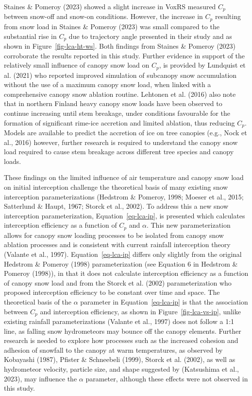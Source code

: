 \documentclass[
  letterpaper,
  DIV=11,
  numbers=noendperiod]{scrartcl}
\begin{document}
Staines \& Pomeroy (2023) showed a slight increase in VoxRS measured
\(C_p\) between snow-off and snow-on conditions. However, the increase
in \(C_p\) resulting from snow load in Staines \& Pomeroy (2023) was
small compared to the substantial rise in \(C_p\) due to trajectory
angle presented in their study and as shown in
Figure~\ref{fig-lca-ht-ws}. Both findings from Staines \& Pomeroy (2023)
corroborate the results reported in this study. Further evidence in
support of the relatively small influence of canopy snow load on
\(C_p\), is provided by Lundquist et al. (2021) who reported improved
simulation of subcanopy snow accumulation without the use of a maximum
canopy snow load, when linked with a comprehensive canopy snow ablation
routine. Lehtonen et al. (2016) also note that in northern Finland heavy
canopy snow loads have been observed to continue increasing until stem
breakage, under conditions favourable for the formation of significant
rime-ice accretion and limited ablation, thus reducing \(C_p\). Models
are available to predict the accretion of ice on tree canopies (e.g.,
Nock et al., 2016) however, further research is required to understand
the canopy snow load required to cause stem breakage across different
tree species and canopy loads.

These findings on the limited influence of air temperature and canopy
snow load on initial interception challenge the theoretical basis of
many existing snow interception parameterizations (Hedstrom \& Pomeroy,
1998; Moeser et al., 2015; Satterlund \& Haupt, 1967; Storck et al.,
2002). To address this a new snow interception parameterization,
Equation~\ref{eq-lca-ip}, is presented which calculates interception
efficiency as a function of \(C_p\) and \(\alpha\). This new
parameterization allows for canopy snow loading processes to be isolated
from canopy snow ablation processes and is consistent with current
rainfall interception theory (Valante et al., 1997).
Equation~\ref{eq-lca-ip} differs only slightly from the original
Hedstrom \& Pomeroy (1998) parameterization (see Equation 6 in Hedstrom
\& Pomeroy (1998)), in that it does not calculate interception
efficiency as a function of canopy snow load and from the Storck et al.
(2002) parameterization who proposed interception efficiency to be
constant over time and space. The theoretical basis of the \(\alpha\)
parameter in Equation~\ref{eq-lca-ip} is that the association between
\(C_p\) and interception efficiency, as shown in
Figure~\ref{fig-lca-vs-ip}, unlike existing rainfall parameterizations
(Valante et al., 1997) does not follow a 1:1 line, as falling snow
hydrometeors may bounce off the canopy elements. Further research is
needed to explore how processes such as the increased cohesion and
adhesion of snowfall to the canopy at warm temperatures, as observed by
Kobayashi (1987), Pfister \& Schneebeli (1999), Storck et al. (2002), as
well as hydrometeor velocity, particle size, and shape suggested by
(Katsushima et al., 2023), may influence the \(\alpha\) parameter,
although these effects were not observed in this study.
\end{document}
